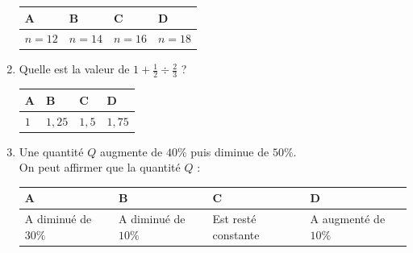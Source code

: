 \documentclass[oneside,12pt]{exam}          %
\begin{document}
\begin{enumerate}[label=\underline{Question \no\arabic*} :  , leftmargin=* , itemsep=4mm]
		\hspace{\linewidth-\textwidth}
		\renewcommand{\arraystretch}{1.5}
		\begin{tabular}{| P{0.22\textwidth} | P{0.22\textwidth} | P{0.22\textwidth} | P{0.22\textwidth} |} \hline
			A & B & C & D \\ \hline
			$n = 12$ & $n = 14$ & $n = 16$ & $n = 18$ \\ \hline
		\end{tabular}
		
		

	\item Quelle est la valeur de $1 + \frac{1}{2} \div \frac{2}{3} $ ?
	
		\hspace{\linewidth-\textwidth}
		\renewcommand{\arraystretch}{1.5}
		\begin{tabular}{| P{0.22\textwidth} | P{0.22\textwidth} | P{0.22\textwidth} | P{0.22\textwidth} |} \hline
			A & B & C & D \\ \hline
			$1$ & $1,25$ & $1,5$ & $1,75$ \\ \hline
		\end{tabular}
		
		
		

	\item Une quantité $Q$ augmente de $40\%$ puis diminue de $50\%$.\\
	On peut affirmer que la quantité $Q$ :
	
		\hspace{\linewidth-\textwidth}
		\renewcommand{\arraystretch}{1.5}
		\begin{tabular}{| P{0.22\textwidth} | P{0.22\textwidth} | P{0.22\textwidth} | P{0.22\textwidth} |} \hline
			A & B & C & D \\ \hline
			A diminué de $30\%$ & A diminué de $10\%$ & Est resté constante & A augmenté de $10\%$ \\ \hline
		\end{tabular}	
		
\end{enumerate}
\end{document}
